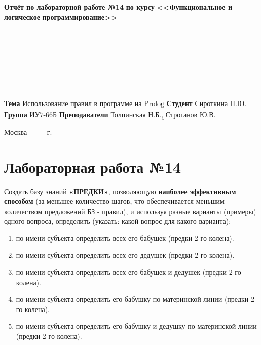 \documentclass[12pt,a4paper]{scrreprt}
\begin{document}
\begin{titlepage}
	\begin{center}
		\noindent\begin{minipage}{1.3\textwidth}\centering
			\Large\textbf{  Отчёт по лабораторной работе №14}\newline
			\textbf{по курсу}\newline
			\textbf{<<Функциональное и логическое}\newline
			\textbf{\indent\indent\indent программирование>>}\newline
		\end{minipage}
	\end{center}
	
	~\\\\\\\\\\\\\\
	\normalsize
	\noindent\textbf{Тема } $\underline{\text{Использование правил в программе на Prolog}}$\newline\newline
	\noindent\textbf{Студент } $\underline{\text{Сироткина П.Ю.}}$\newline\newline
	\noindent\textbf{Группа } $\underline{\text{ИУ7-66Б}}$\newline\newline
	\noindent\textbf{Преподаватели } $\underline{\text{Толпинская Н.Б., Строганов Ю.В.}}$\newline
	
	\begin{center}
		\vfill
		Москва~---~\the\year
		~г.
	\end{center}
\end{titlepage}

\chapter*{Лабораторная работа №14}

Создать базу знаний \textbf{«ПРЕДКИ»}, позволяющую \textbf{наиболее эффективным способом}
(за меньшее количество шагов, что обеспечивается меньшим количеством предложений БЗ -
правил), и используя разные варианты (примеры) одного вопроса, определить (указать:
какой вопрос для какого варианта):

\begin{enumerate}
	\item по имени субъекта определить всех его бабушек (предки 2-го колена).
	\item по имени субъекта определить всех его дедушек (предки 2-го колена).
	\item по имени субъекта определить всех его бабушек и дедушек (предки
	2-го колена).
	\item по имени субъекта определить его бабушку по материнской линии
	(предки 2-го колена).
	\item по имени субъекта определить его бабушку и дедушку по материнской
	линии (предки 2-го колена).
\end{enumerate}
\end{document}
